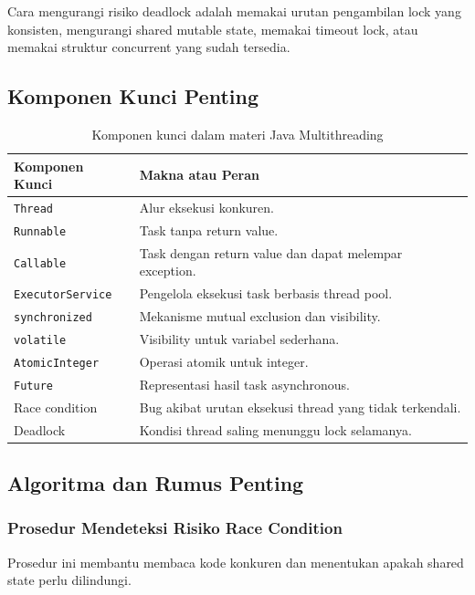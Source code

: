 Cara mengurangi risiko deadlock adalah memakai urutan pengambilan lock yang konsisten, mengurangi shared mutable state, memakai timeout lock, atau memakai struktur concurrent yang sudah tersedia.

\subsection{Komponen Kunci Penting}

\begin{table}[H]
\centering
\begin{tabularx}{\textwidth}{|L{0.28\textwidth}|X|}
\hline
\textbf{Komponen Kunci} & \textbf{Makna atau Peran} \\
\hline
\texttt{Thread} & Alur eksekusi konkuren. \\
\hline
\texttt{Runnable} & Task tanpa return value. \\
\hline
\texttt{Callable} & Task dengan return value dan dapat melempar exception. \\
\hline
\texttt{ExecutorService} & Pengelola eksekusi task berbasis thread pool. \\
\hline
\texttt{synchronized} & Mekanisme mutual exclusion dan visibility. \\
\hline
\texttt{volatile} & Visibility untuk variabel sederhana. \\
\hline
\texttt{AtomicInteger} & Operasi atomik untuk integer. \\
\hline
\texttt{Future} & Representasi hasil task asynchronous. \\
\hline
Race condition & Bug akibat urutan eksekusi thread yang tidak terkendali. \\
\hline
Deadlock & Kondisi thread saling menunggu lock selamanya. \\
\hline
\end{tabularx}
\caption{Komponen kunci dalam materi Java Multithreading}
\label{tab:komponen-kunci-java-multithreading}
\end{table}

\subsection{Algoritma dan Rumus Penting}

\subsubsection{Prosedur Mendeteksi Risiko Race Condition}

\begin{jawab}
Prosedur ini membantu membaca kode konkuren dan menentukan apakah shared state perlu dilindungi.
\end{jawab}

